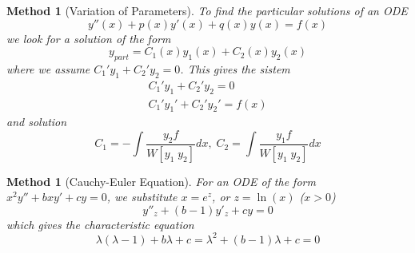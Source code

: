 \documentclass[12pt]{article}
\newtheorem{met}[thm]{Method}
\theoremstyle{definition}
\theoremstyle{remark}
\numberwithin{equation}{section}
\begin{document}
\vspace{1cm}

\begin{met}[Variation of Parameters]
        To find the particular solutions of an ODE \begin{equation}
                y''(x) + p(x)y'(x) + q(x)y(x) = f(x)
        \end{equation} 
        we look for a solution of the form \begin{equation}
                y_{part} = C_1(x)y_1(x) + C_2(x)y_2(x)
        \end{equation}
        where we assume $C_1'y_1 + C_2'y_2 = 0$. This gives the sistem \begin{equation}
                \begin{matrix} C_1'y_1 + C_2'y_2 =0 \\ C_1'y_1' + C_2'y_2' = f(x) \end{matrix}
        \end{equation}
        and solution \begin{equation}
                C_1 = -\int\frac{y_2f}{W[y_1\;y_2]}dx,\;C_2 = \int\frac{y_1f}{W[y_1\;y_2]}dx
        \end{equation}
\end{met}


\vspace{1cm}

\begin{met}[Cauchy-Euler Equation]
        For an ODE of the form $x^2y'' + bxy' + cy = 0$, we substitute $x = e^z$, or $z = \ln(x)$ ($x > 0$) \begin{equation}
                y''_z + (b-1)y'_z +cy = 0
        \end{equation}
        which gives the characteristic equation\begin{equation}
                \lambda(\lambda - 1) + b\lambda + c = \lambda^2 + (b-1)\lambda +c = 0
        \end{equation}
\end{met}

\vspace{1cm}
\end{document}
